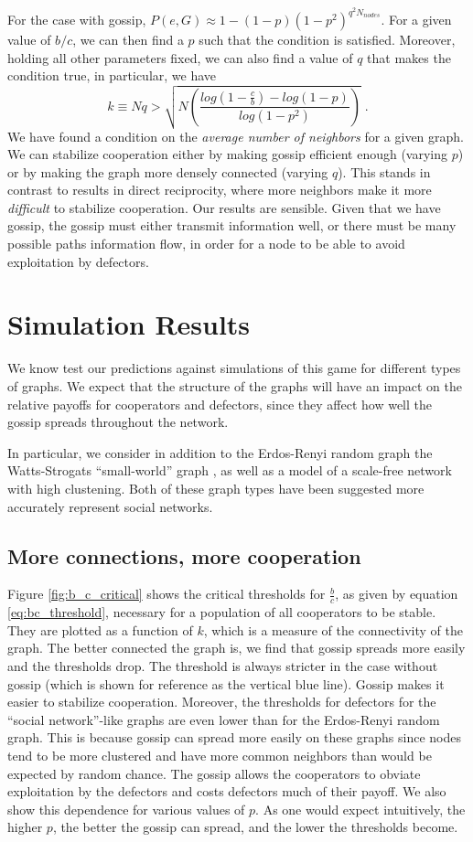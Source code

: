 \documentclass{article}
\renewcommand{\=}[1]{\stackrel{#1}{=}} %
\begin{document}
For the case with gossip, $P(e,G) \approx 1 - (1-p)(1-p^2)^{q^2N_{nodes}}$. For a given value of $b/c$, we can then find a $p$ such that the condition is satisfied. Moreover, holding all other parameters fixed, we can also find a value of $q$ that makes the condition true, in particular, we have
$$k \equiv N q > \sqrt{N  \left(\frac{log(1 - \frac{c}{b}) - log(1 - p)}{log(1 - p^2)}\right)}\;.$$
We have found a condition on the \emph{average number of neighbors} for a given graph. We can stabilize cooperation either by making gossip efficient enough (varying $p$) or by making the graph more densely connected (varying $q$). This stands in contrast to results in direct reciprocity, where more neighbors make it more \emph{difficult} to stabilize cooperation. Our results are sensible. Given that we have gossip, the gossip must either transmit information well, or there must be many possible paths information flow, in order for a node to be able to avoid exploitation by defectors. 

\section{Simulation Results}
We know test our predictions against simulations of this game for different types of graphs. We expect that the structure of the graphs will have an impact on the relative payoffs for cooperators and defectors, since they affect how well the gossip spreads throughout the network.

In particular, we consider in addition to the Erdos-Renyi random graph the Watts-Strogats ``small-world'' graph \cite{watts1998collective}, as well as a model of a scale-free network \cite{holme2002growing} with high clustening. Both of these graph types have been suggested more accurately represent social networks.

\subsection{More connections, more cooperation}

Figure \ref{fig:b_c_critical} shows the critical thresholds for $\frac{b}{c}$, as given by equation \ref{eq:bc_threshold}, necessary for a population of all cooperators to be stable. They are plotted as a function of $k$, which is a measure of the connectivity of the graph. The better connected the graph is, we find that gossip spreads more easily and the thresholds drop. The threshold is always stricter in the case without gossip (which is shown for reference as the vertical blue line). Gossip makes it easier to stabilize cooperation. Moreover, the thresholds for defectors for the ``social network''-like graphs are even lower than for the Erdos-Renyi random graph. This is because gossip can spread more easily on these graphs since nodes tend to be more clustered and have more common neighbors than would be expected by random chance. The gossip allows the cooperators to obviate exploitation by the defectors and costs defectors much of their payoff. We also show this dependence for various values of $p$. As one would expect intuitively, the higher $p$, the better the gossip can spread, and the lower the thresholds become.
\end{document}
